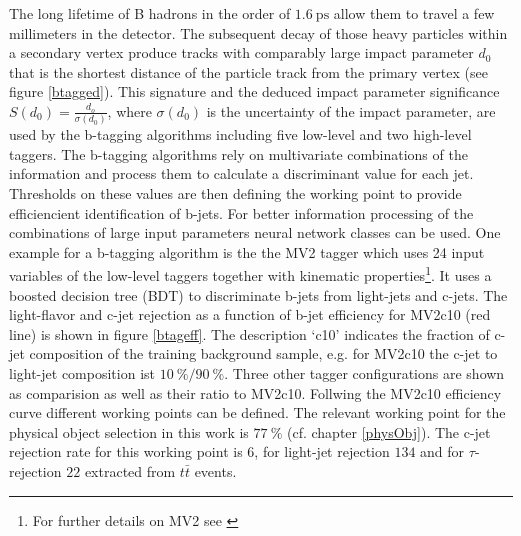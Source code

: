 The long lifetime of B hadrons in the order of $\SI{1.6}{\pico\second}$ allow them to travel a few millimeters in the detector. The subsequent decay of those heavy particles within a secondary vertex produce tracks with comparably large impact parameter $d_0$ that is the shortest distance of the particle track from the primary vertex (see figure \ref{btagged}). This signature and the deduced impact parameter significance $S(d_0)=\frac{d_o}{\sigma(d_0)}$, where $\sigma(d_0)$ is the uncertainty of the impact parameter, are used by the b-tagging algorithms including five low-level and two high-level taggers. \cite{Hansson} The b-tagging algorithms rely on multivariate combinations of the information and process them to calculate a discriminant value for each jet. Thresholds on these values are then defining the working point to provide efficiencient identification of b-jets. For better information processing of the combinations of large input parameters neural network classes can be used. \cite{Luca} One example for a b-tagging algorithm is the the MV2 tagger which uses 24 input variables of the low-level taggers together with kinematic properties\footnote{For further details on MV2 see \cite{MV2}}. \cite{Paganini} It uses a boosted decision tree (BDT) to discriminate b-jets from light-jets and c-jets. \cite{MV2} The light-flavor and c-jet rejection as a function of b-jet efficiency for MV2c10 (red line) is shown in figure \ref{btageff}. The description `c10' indicates the fraction of c-jet composition of the training background sample, e.g. for MV2c10 the c-jet to light-jet composition ist $\SI{10}{\percent}/\SI{90}{\percent}$. Three other tagger configurations are shown as comparision as well as their ratio to MV2c10. Follwing the MV2c10 efficiency curve different working points can be defined. The relevant working point for the physical object selection in this work is $\SI{77}{\percent}$ (cf. chapter \ref{physObj}). The c-jet rejection rate for this working point is $6$, for light-jet rejection $134$ and for $\tau$-rejection $22$ extracted from $t\bar{t}$ events. \cite{MV2c10}    
